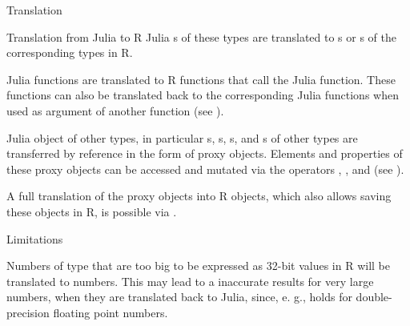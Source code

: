 \begin{Section}{Translation}
\begin{SubSection}{Translation from Julia to R}
Julia s of these types are translated to s or s of the corresponding types in R.


Julia functions are translated to R functions that call the Julia function.
These functions can also be translated back to the
corresponding Julia functions when used as argument of another function
(see ).


Julia object of other types, in particular s, s, s,
and s of other types are transferred by reference in the form of proxy objects.
Elements and properties of these proxy objects can be accessed and mutated via the operators \code{`[[`},
\code{`[`}, and  (see ).

A full translation of the proxy objects into R objects, which also allows saving these objects in R,
is possible via .


\end{SubSection}

\end{Section}
%
\begin{Section}{Limitations}


Numbers of type  that are too big to be expressed as 32-bit
 values in R will be translated to  numbers.
This may lead to a inaccurate results for very large numbers,
when they are translated back to Julia, since, e. g.,
 holds for double-precision
floating point numbers.
\end{Section}
\aliasA{[.JuliaProxy}{AccessMutate.JuliaProxy}{[.JuliaProxy}
\aliasA{[.JuliaSimpleArrayProxy}{AccessMutate.JuliaProxy}{[.JuliaSimpleArrayProxy}
\aliasA{[<\Rdash{}.JuliaProxy}{AccessMutate.JuliaProxy}{[<.Rdash..JuliaProxy}
\aliasA{[[.JuliaArrayProxy}{AccessMutate.JuliaProxy}{[[.JuliaArrayProxy}
\aliasA{[[.JuliaStructProxy}{AccessMutate.JuliaProxy}{[[.JuliaStructProxy}
\aliasA{[[<\Rdash{}.JuliaArrayProxy}{AccessMutate.JuliaProxy}{[[<.Rdash..JuliaArrayProxy}
